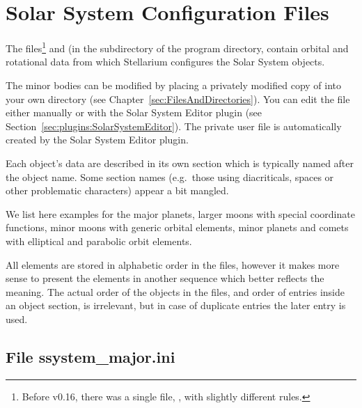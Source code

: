 

\section{Solar System Configuration Files}
\label{sec:ssystem.ini}

The files\footnote{Before v0.16, there was a single file, , with slightly different rules.}
  and    
(in the  subdirectory of the program directory, 
contain orbital and rotational data from which Stellarium configures the Solar
System objects. 

The minor bodies can be modified by placing a privately modified 
copy of  into your own
 directory (see Chapter~\ref{sec:FilesAndDirectories}). 
You can edit the file either manually or with the Solar System Editor plugin (see
Section~\ref{sec:plugins:SolarSystemEditor}). The private user file is automatically created by the Solar System Editor plugin.



Each object's data are described in its own section which is typically
named after the object name. Some section names (e.g.\ those using
diacriticals, spaces or other problematic characters) appear a bit mangled.

We list here examples for the major planets, larger moons with special
coordinate functions, minor moons with generic orbital elements, minor
planets and comets with elliptical and parabolic orbit elements.

All elements are stored in alphabetic order in the files, however it
makes more sense to present the elements in another sequence which
better reflects the meaning. The actual order of the objects in the
files, and order of entries inside an object section, is irrelevant,
but in case of duplicate entries the later entry is used.

\subsection{File ssystem\_major.ini}
\label{sec:ssystem.ini:major}



